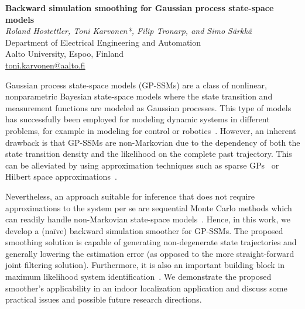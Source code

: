 \documentclass[12pt]{article}
\newcommand{\postertitle}[1]{{\Large\bf #1}\\[12pt]}
\newcommand{\authors}[1]{\emph{#1}\\}
\newcommand{\affiliations}[1]{{#1}\\}
\newcommand{\contacts}[1]{{#1}}
\begin{document}
\begin{center}
\vspace*{0.5cm}
%
\postertitle{Backward simulation smoothing for Gaussian process state-space models}
%
\authors{Roland Hostettler, Toni Karvonen*, Filip Tronarp, and Simo S\"arkk\"a}
% 
\affiliations{Department of Electrical Engineering and Automation \\ Aalto University, Espoo, Finland}
%
\contacts{\url{toni.karvonen@aalto.fi}} %
%
\vspace*{0.3cm}
\end{center}

\noindent Gaussian process state-space models (GP-SSMs) are a class of nonlinear, nonparametric Bayesian state-space models where the state transition and measurement functions are modeled as Gaussian processes. This type of models has successfully been employed for modeling dynamic systems in different problems, for example in modeling for control or robotics~\cite{DeisenrothTurnerHuber2012,FrigolaLindstenSchon2013}. However, an inherent drawback is that GP-SSMs are non-Markovian due to the dependency of both the state transition density and the likelihood on the complete past trajectory. This can be alleviated by using approximation techniques such as sparse GPs~\cite{QuinoneroCandelaRasmussen2005} or Hilbert space approximations~\cite{SvenssonSolinSarkka2016}.

Nevertheless, an approach suitable for inference that does not require approximations to the system per se are sequential Monte Carlo methods which can readily handle non-Markovian state-space models~\cite{FrigolaLindstenSchon2013,LindstenSchonJordan2013}. Hence, in this work, we develop a (naïve) backward simulation smoother for GP-SSMs. The proposed smoothing solution is capable of generating non-degenerate state trajectories and generally lowering the estimation error (as opposed to the more straight-forward joint filtering solution). Furthermore, it is also an important building block in maximum likelihood system identification~\cite{FrigolaChenRasmussen2014,DeisenrothShakir2012}. We demonstrate the proposed smoother's applicability in an indoor localization application and discuss some practical issues and possible future research directions.
\end{document}
